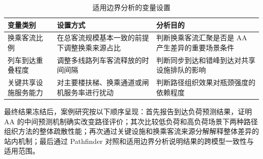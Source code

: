 \documentclass[UTF8,a4paper,12pt]{ctexart}
\begin{document}
\begin{table}[htbp]
\centering
\caption{适用边界分析的变量设置}
\small
\begin{tabular}{p{}p{}p{}}
\toprule
变量类别 & 设置方式 & 分析目的 \\
\midrule
换乘客流比例 & 在总客流规模基本一致的前提下调整换乘来源占比 & 判断换乘客流汇聚是否是 AA 产生差异的重要场景条件 \\
列车到达重叠程度 & 调整多线路列车客流释放的时间间隔 & 判断同步到达和错峰到达对共享设施排队的影响 \\
关键共享设施服务能力 & 对主要楼扶梯、换乘通道或闸机服务率进行扰动 & 判断路径组织效果对瓶颈强度的依赖程度 \\
\bottomrule
\end{tabular}
\end{table}

最终结果冻结后，案例研究按以下顺序呈现：首先报告到达负荷预测结果，证明 AA 的中间预测机制确实改变路径评价；其次比较低负荷和高负荷场景下两种路径组织方法的整体疏散性能；再次通过关键设施和换乘客流来源分解解释整体差异的站内机制；最后通过 Pathfinder 对照和适用边界分析说明结果的跨模型一致性与适用范围。
\end{document}
